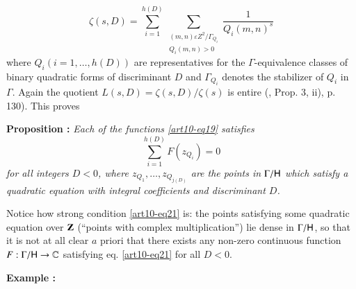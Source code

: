 \begin{equation}
\zeta(s, D) = \sum\limits^{h(D)}_{i =1} \sum\limits_{\substack{(m,n) \varepsilon Z^2 / \Gamma_{Q_i}\\ Q_i (m,n)>0}} \frac{1}{Q_i (m, n)^s}
\tag{20}\label{art10-eq20}
\end{equation}
where $Q_i(i=1,\ldots, h (D))$ are representatives for the $\Gamma$-equivalence classes of binary quadratic forms of discriminant $D$ and $\Gamma_{Q_i}$ denotes the stabilizer of $Q_i$ in $\Gamma$. Again the quotient $L (s, D) = \zeta (s, D) / \zeta(s)$ is entire (\cite{art10-11}, Prop. 3, ii), p. 130). This proves

\medskip
\noindent
{\bfseries Proposition :\label{art10-prop1}}
\textit{Each of the functions \eqref{art10-eq19} satisfies}
\begin{equation}
\sum\limits^{h(D)}_{i=1} F(z_{Q_i}) = 0 \tag{21}  \label{art10-eq21}
\end{equation}
\textit{for all integers $D <0$, where $z_{Q_1}, \ldots, z_{Q_{j(D)}}$ are the points in $\Gamma / \mathsf{H}$ which satisfy a quadratic equation with integral coefficients and discriminant $D$.}

Notice how strong condition \eqref{art10-eq21} is: the points satisfying some quadratic equation over $\mathbf{Z}$ (``points with complex multiplication'') lie dense in $\Gamma/ \mathsf{H}$, so that it is not at all clear $a$ priori that there exists any non-zero continuous function $F: \Gamma / \mathsf{H} \to \mathbb{C}$ satisfying eq. \eqref{art10-eq21} for all $D <0$.

\medskip
\noindent
{\bfseries Example :\label{art10-exam2}}


